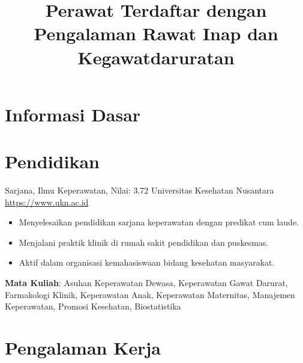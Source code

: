 \documentclass[a4paper, serif, 10pt]{moderncv}
\title{Perawat Terdaftar dengan Pengalaman Rawat Inap dan Kegawatdaruratan}
\begin{document}
\maketitle

\section{Informasi Dasar}

\section{Pendidikan}

        {Sarjana, Ilmu Keperawatan, Nilai: 3.72}
        {Universitas Kesehatan Nusantara}
        {\url{https://www.ukn.ac.id}}
        {}
        {\begin{itemize}
\item Menyelesaikan pendidikan sarjana keperawatan dengan predikat cum laude.
\item Menjalani praktik klinik di rumah sakit pendidikan dan puskesmas.
\item Aktif dalam organisasi kemahasiswaan bidang kesehatan masyarakat.
\end{itemize}
\textbf{Mata Kuliah}: Asuhan Keperawatan Dewasa, Keperawatan Gawat Darurat, Farmakologi Klinik, Keperawatan Anak, Keperawatan Maternitas, Manajemen Keperawatan, Promosi Kesehatan, Biostatistika}
\section{Pengalaman Kerja}
\end{document}
